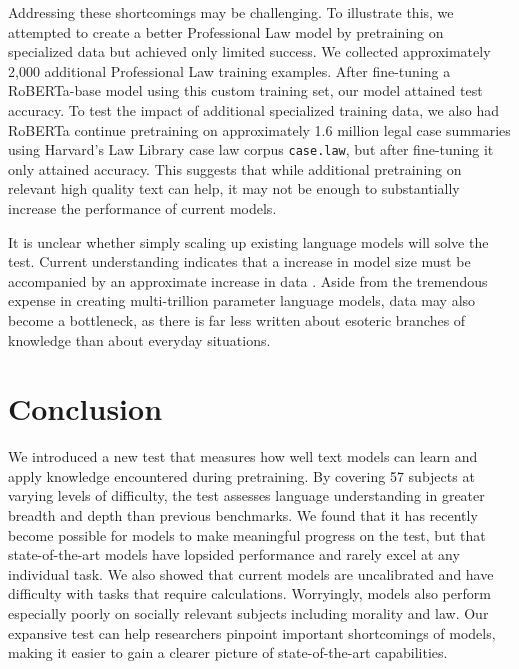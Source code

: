\documentclass{article} \usepackage{iclr2021_conference, times}
\begin{document}
Addressing these shortcomings may be challenging. To illustrate this, we attempted to create a better Professional Law model by pretraining on specialized data but achieved only limited success. We collected approximately 2,000 additional Professional Law training examples. After fine-tuning a RoBERTa-base model \citep{RobertaLiu2019AR} using this custom training set, our model attained  test accuracy. To test the impact of additional specialized training data, we also had RoBERTa continue pretraining on approximately 1.6 million legal case summaries using Harvard’s Law Library case law corpus \texttt{case.law}, but after fine-tuning it only attained  accuracy. This suggests that while additional pretraining on relevant high quality text can help, it may not be enough to substantially increase the performance of current models. 

It is unclear whether simply scaling up existing language models will solve the test. Current understanding indicates that a  increase in model size must be accompanied by an approximate  increase in data \citep{kaplan2020scalinglaws}. Aside from the tremendous expense in creating multi-trillion parameter language models, data may also become a bottleneck, as there is far less written about esoteric branches of knowledge than about everyday situations.





%
 \section{Conclusion}






We introduced a new test that measures how well text models can learn and apply knowledge encountered during pretraining. By covering 57 subjects at varying levels of difficulty, the test assesses language understanding in greater breadth and depth than previous benchmarks.
We found that it has recently become possible for models to make meaningful progress on the test, but that state-of-the-art models have lopsided performance and rarely excel at any individual task. We also showed that current models are uncalibrated and have difficulty with tasks that require calculations. Worryingly, models also perform especially poorly on socially relevant subjects including morality and law.
Our expansive test can help researchers pinpoint important shortcomings of models, making it easier to gain a clearer picture of state-of-the-art capabilities.
\end{document}
